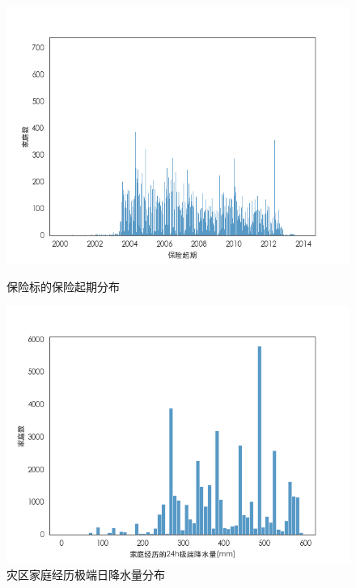 \begin{figure}[H]
\begin{minipage}{0.48\linewidth}
        \includegraphics[width=\linewidth]{img/insurance.png}
        \caption{保险标的保险起期分布}\label{fig:insurance}
    \end{minipage}
    \begin{minipage}{0.48\linewidth}
        \includegraphics[width=\linewidth]{lib/img/precip.png}
        \caption{灾区家庭经历极端日降水量分布}\label{fig:precip}
    \end{minipage}
\end{figure}
%     

